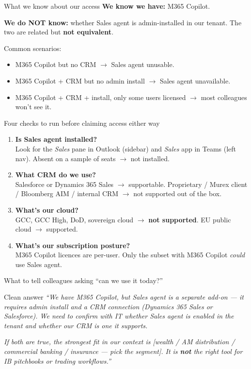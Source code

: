 \documentclass[11pt,aspectratio=169]{beamer}
\newcommand{\hl}[1]{\textbf{\textcolor{accentteal}{#1}}}
\begin{document}
\begin{frame}{What we know about our access}
  \textbf{We know we have:} M365 Copilot.

  \medskip
  \textbf{We do NOT know:} whether Sales agent is admin-installed in our tenant. The two are related but \hl{not equivalent}.

  \medskip
  Common scenarios:
  \begin{itemize}
    \item M365 Copilot but no CRM $\rightarrow$ Sales agent unusable.
    \item M365 Copilot + CRM but no admin install $\rightarrow$ Sales agent unavailable.
    \item M365 Copilot + CRM + install, only some users licensed $\rightarrow$ most colleagues won't see it.
  \end{itemize}
\end{frame}

\begin{frame}{Four checks to run before claiming access either way}
  \begin{enumerate}
    \item \textbf{Is Sales agent installed?}\\
       Look for the \textit{Sales} pane in Outlook (sidebar) and \textit{Sales} app in Teams (left nav). Absent on a sample of seats $\rightarrow$ not installed.
    \item \textbf{What CRM do we use?}\\
       Salesforce or Dynamics 365 Sales $\rightarrow$ supportable. Proprietary / Murex client / Bloomberg AIM / internal CRM $\rightarrow$ not supported out of the box.
    \item \textbf{What's our cloud?}\\
       GCC, GCC High, DoD, sovereign cloud $\rightarrow$ \hl{not supported}. EU public cloud $\rightarrow$ supported.
    \item \textbf{What's our subscription posture?}\\
       M365 Copilot licences are per-user. Only the subset with M365 Copilot \textit{could} use Sales agent.
  \end{enumerate}
\end{frame}

\begin{frame}{What to tell colleagues asking ``can we use it today?''}
  \begin{exampleblock}{Clean answer}
    \small \textit{``We have M365 Copilot, but Sales agent is a separate add-on --- it requires admin install and a CRM connection (Dynamics 365 Sales or Salesforce). We need to confirm with IT whether Sales agent is enabled in the tenant and whether our CRM is one it supports.}

    \medskip
    \textit{If both are true, the strongest fit in our context is [wealth / AM distribution / commercial banking / insurance --- pick the segment]. It is \hl{not} the right tool for IB pitchbooks or trading workflows.''}
  \end{exampleblock}
\end{frame}
\end{document}
